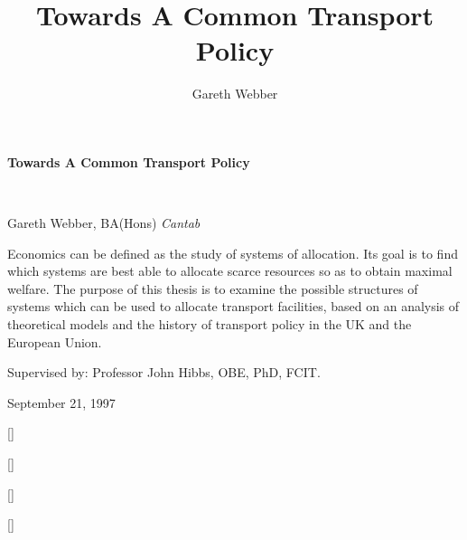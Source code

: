 \documentclass[11pt]{report}
\begin{document}
\begin{titlepage}
\pagecolor{titlepagecolor}\color{white}
{\noindent \titlefont \LARGE \bfseries Towards A Common Transport Policy}\title{Towards A Common Transport Policy}\\
\makebox[0pt][l]{\rule{1.3\textwidth}{2pt}}
\par {\noindent \titlefont \textcolor{namecolor}{Gareth Webber, BA(Hons) \textit{Cantab}}}\author{Gareth Webber}
\vskip 3cm
{\noindent Economics can be defined as the study of systems of allocation. Its goal is to find which systems are best able to allocate scarce resources so as to obtain maximal welfare. The purpose of this thesis is to examine the possible structures of systems which can be used to allocate transport facilities, based on an analysis of theoretical models and the history of transport policy in the UK and the European Union.}
\par {\noindent  \textcolor{namecolor}{Supervised by: Professor John Hibbs, OBE, PhD, FCIT.}}
\par {\noindent  \textcolor{namecolor}{September 21, 1997}}
\end{titlepage}
\restoregeometry 
\pagecolor{white}

\titleformat{\chapter}[block]{\Huge\titlefont\bfseries}{\thechapter}{0ex}{\centering} []
\titleformat{\section}[block]{\Huge\titlefont\bfseries}{}{0ex}{\centering} []

\setcounter{tocdepth}{0}
\tableofcontents
\setcounter{tocdepth}{1}
\listoftables
\listoffigures

\titleformat{\chapter}[block]{\Huge\titlefont\bfseries}{\centering\thechapter\vskip -10pt}{0ex}{\centering\rule{0.3\textwidth}{2pt}\vskip 0pt\centering} []

	
		





\titleformat{\chapter}[block]{\Huge\titlefont\bfseries}{\thechapter}{0ex}{\centering} []


\end{document}
